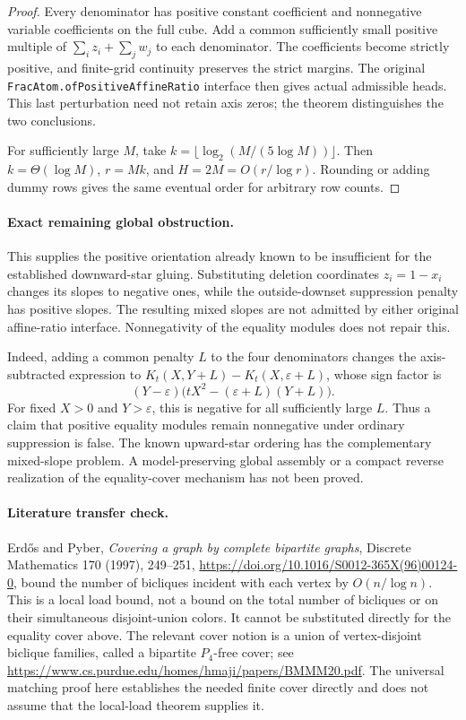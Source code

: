 \documentclass[11pt]{article}
\begin{document}
\begin{proof}
Every denominator has positive constant coefficient and nonnegative
variable coefficients on the full cube. Add a common sufficiently
small positive multiple of $\sum_i z_i+\sum_jw_j$ to each denominator.
The coefficients become strictly positive, and finite-grid continuity
preserves the strict margins. The original
\texttt{FracAtom.ofPositiveAffineRatio} interface then gives actual
admissible heads. This last perturbation need not retain axis zeros;
the theorem distinguishes the two conclusions.

For sufficiently large $M$, take
$k=\lfloor\log_2(M/(5\log M))\rfloor$. Then $k=\Theta(\log M)$,
$r=Mk$, and $H=2M=O(r/\log r)$. Rounding or adding dummy rows gives
the same eventual order for arbitrary row counts.
\end{proof}

\paragraph{Exact remaining global obstruction.}
This supplies the positive orientation already known to be insufficient
for the established downward-star gluing. Substituting deletion
coordinates $z_i=1-x_i$ changes its slopes to negative ones, while the
outside-downset suppression penalty has positive slopes. The resulting
mixed slopes are not admitted by either original affine-ratio interface.
Nonnegativity of the equality modules does not repair this.

Indeed, adding a common penalty $L$ to the four denominators changes
the axis-subtracted expression to
$K_t(X,Y+L)-K_t(X,\varepsilon+L)$, whose sign factor is
\[
 (Y-\varepsilon)\bigl(tX^2-(\varepsilon+L)(Y+L)\bigr).
\]
For fixed $X>0$ and $Y>\varepsilon$, this is negative for all sufficiently
large $L$. Thus a claim that positive equality modules remain
nonnegative under ordinary suppression is false.
The known upward-star ordering has the complementary mixed-slope
problem. A model-preserving global assembly or a compact reverse
realization of the equality-cover mechanism has not been proved.

\paragraph{Literature transfer check.}
Erd\H{o}s and Pyber, \emph{Covering a graph by complete bipartite graphs},
Discrete Mathematics 170 (1997), 249--251,
\url{https://doi.org/10.1016/S0012-365X(96)00124-0},
bound the number of bicliques incident with each vertex by
$O(n/\log n)$. This is a local load bound, not a bound on the total
number of bicliques or on their simultaneous disjoint-union colors.
It cannot be substituted directly for the equality cover above.
The relevant cover notion is a union of vertex-disjoint biclique
families, called a bipartite $P_4$-free cover; see
\url{https://www.cs.purdue.edu/homes/hmaji/papers/BMMM20.pdf}.
The universal matching proof here establishes the needed finite cover
directly and does not assume that the local-load theorem supplies it.
\end{document}
